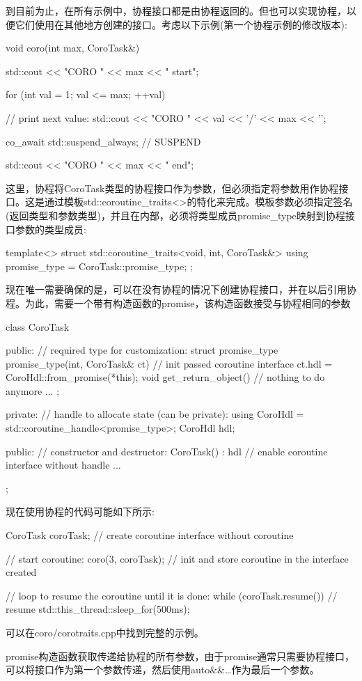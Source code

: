 到目前为止，在所有示例中，协程接口都是由协程返回的。但也可以实现协程，以便它们使用在其他地方创建的接口。考虑以下示例(第一个协程示例的修改版本):

\begin{cpp}
void coro(int max, CoroTask&)
{
	std::cout << "CORO " << max << " start\n";
	
	for (int val = 1; val <= max; ++val) {
		// print next value:
		std::cout << "CORO " << val << '/' << max << '\n';
		
		co_await std::suspend_always{}; // SUSPEND
	}
	
	std::cout << "CORO " << max << " end\n";
}
\end{cpp}

这里，协程将CoroTask类型的协程接口作为参数，但必须指定将参数用作协程接口。这是通过模板std::coroutine\_traits<>的特化来完成。模板参数必须指定签名(返回类型和参数类型)，并且在内部，必须将类型成员promise\_type映射到协程接口参数的类型成员:

\begin{cpp}
template<>
struct std::coroutine_traits<void, int, CoroTask&>
{
	using promise_type = CoroTask::promise_type;
};
\end{cpp}

现在唯一需要确保的是，可以在没有协程的情况下创建协程接口，并在以后引用协程。为此，需要一个带有构造函数的promise，该构造函数接受与协程相同的参数

\begin{cpp}
class CoroTask {
	public:
	// required type for customization:
	struct promise_type {
		promise_type(int, CoroTask& ct) { // init passed coroutine interface	
			ct.hdl = CoroHdl::from_promise(*this);
		}
		void get_return_object() { // nothing to do anymore
		}
		...
	};
		
private:
	// handle to allocate state (can be private):
	using CoroHdl = std::coroutine_handle<promise_type>;
	CoroHdl hdl;
	
public:
	// constructor and destructor:
	CoroTask() : hdl{} { // enable coroutine interface without handle
	}
	...
};
\end{cpp}

现在使用协程的代码可能如下所示:

\begin{cpp}
CoroTask coroTask; // create coroutine interface without coroutine

// start coroutine:
coro(3, coroTask); // init and store coroutine in the interface created

// loop to resume the coroutine until it is done:
while (coroTask.resume()) { // resume
	std::this_thread::sleep_for(500ms);
}
\end{cpp}

可以在coro/corotraits.cpp中找到完整的示例。

promise构造函数获取传递给协程的所有参数，由于promise通常只需要协程接口，可以将接口作为第一个参数传递，然后使用auto\&\&…作为最后一个参数。










